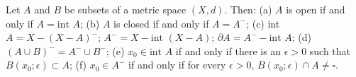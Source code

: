 Let $A$ and $B$ be subsets of a metric space $(X, d)$. Then:
(a) $A$ is open if and only if $A = \text{int } A$;
(b) $A$ is closed if and only if $A = A^-$;
(c) int $A = X - (X - A)^-$; $A^- = X - \text{int } (X - A)$; $\partial A = A^- - \text{int } A$;
(d) $(A \cup B)^- = A^- \cup B^-$;
(e) $x_0 \in \text{int } A$ if and only if there is an $\epsilon > 0$ such that $B(x_0; \epsilon) \subset A$;
(f) $x_0 \in A^-$ if and only if for every $\epsilon > 0$, $B(x_0; \epsilon) \cap A \neq \square$.